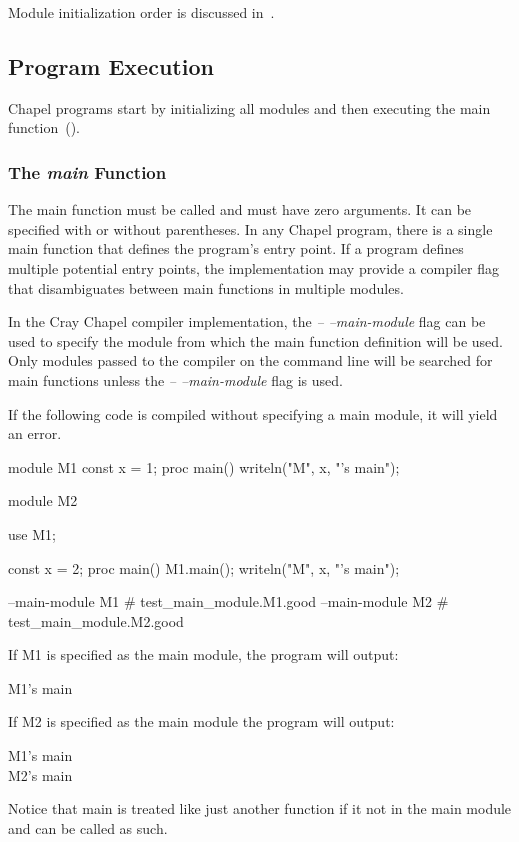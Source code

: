 Module initialization order is discussed
in~.


\subsection{Program Execution}
\label{Program_Execution}

Chapel programs start by initializing all modules and then executing
the main function~().

\subsubsection{The {\em main} Function}
\label{The_main_Function}

The main function must be called  and must have zero
arguments.  It can be specified with or without parentheses.  In any
Chapel program, there is a single main function that defines the
program's entry point.  If a program defines multiple potential entry
points, the implementation may provide a compiler flag that
disambiguates between main functions in multiple modules.

\begin{craychapel}
In the Cray Chapel compiler implementation, the \emph{--
--main-module} flag can be used to specify the module from which the
main function definition will be used.  Only modules passed to the
compiler on the command line will be searched for main functions
unless the \emph{-- --main-module} flag is used.
\end{craychapel}

\begin{example}
If the following code is compiled without specifying a main module, it
will yield an error.
\begin{chapelpre}
\end{chapelpre}
\begin{chapel}
module M1 {
  const x = 1;
  proc main() {
    writeln("M", x, "'s main");
  }
}
 
module M2 {
  use M1;

  const x = 2;
  proc main() {
    M1.main();
    writeln("M", x, "'s main");
  }
}
\end{chapel}
\begin{chapelcompopts}
--main-module M1 \# test\_main\_module.M1.good
--main-module M2 \# test\_main\_module.M2.good
\end{chapelcompopts}
If M1 is specified as the main module, the program will output:
\begin{chapelprintoutput}
M1's main
\end{chapelprintoutput}
If M2 is specified as the main module the program will output:
\begin{chapelprintoutput}
M1's main\\
M2's main
\end{chapelprintoutput}
Notice that main is treated like just another function if it not in
the main module and can be called as such.
\end{example}

